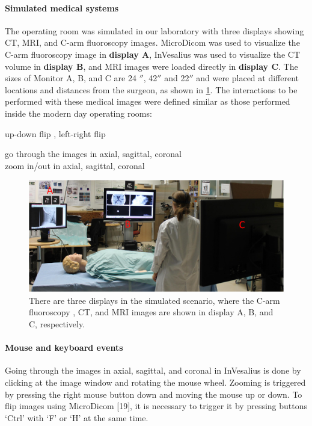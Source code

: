 {\paragraph{Simulated medical systems}
The operating room was simulated in our laboratory with three displays showing CT, MRI, and C-arm fluoroscopy images. 
MicroDicom\cite{Tangcharoen2011} was used to visualize the C-arm fluoroscopy image in \textbf{display A}, InVesalius\cite{Moraes2012} was used to visualize the CT volume in \textbf{display B}, and MRI images were loaded directly in \textbf{display C}. The sizes of Monitor A, B, and C are 24 $''$, 42$''$ and 22$''$ and were placed at different locations and distances from the surgeon, as shown in \figurename{\ref{fig:4-PointingOR:ORSEnvironment}}. The interactions to be performed with these medical images were defined similar as those performed inside the modern day operating rooms:
\begin{description}
	[align=right,style=nextline,leftmargin= 0.3\linewidth,labelsep=\parindent,font=\normalfont]
	\item [Fluoroscopy image:] up-down flip , left-right flip
	\item [CT \& MRI images:] go through the images in axial, sagittal, coronal\\ zoom in/out in axial, sagittal, coronal
\end{description}
\begin{figure}
	\includegraphics[width=1.0\textwidth]{figures/4-PointingOR/Displays.png}
	\caption{There are three displays in the simulated scenario, where the C-arm fluoroscopy , CT, and MRI images are shown in display A, B, and C, respectively.}
	\label{fig:4-PointingOR:ORSEnvironment}       %
\end{figure}
\paragraph{Mouse and keyboard events}
Going through the images in axial, sagittal, and coronal in InVesalius\cite{Moraes2012} is done by clicking at the image window and rotating the mouse wheel. Zooming is triggered by pressing the right mouse button down and moving the mouse up or down. To flip images using MicroDicom [19], it is necessary to trigger it by pressing buttons `Ctrl' with `F' or `H' at the same time. 

}
